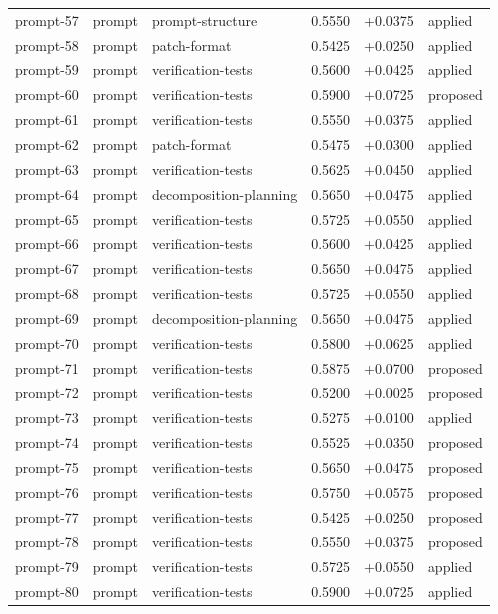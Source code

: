 \begin{center}
\begin{longtable}{llp{5.2cm}rrl}
prompt-57 & prompt & prompt-structure & 0.5550 & +0.0375 & applied \\
prompt-58 & prompt & patch-format & 0.5425 & +0.0250 & applied \\
prompt-59 & prompt & verification-tests & 0.5600 & +0.0425 & applied \\
prompt-60 & prompt & verification-tests & 0.5900 & +0.0725 & proposed \\
prompt-61 & prompt & verification-tests & 0.5550 & +0.0375 & applied \\
prompt-62 & prompt & patch-format & 0.5475 & +0.0300 & applied \\
prompt-63 & prompt & verification-tests & 0.5625 & +0.0450 & applied \\
prompt-64 & prompt & decomposition-planning & 0.5650 & +0.0475 & applied \\
prompt-65 & prompt & verification-tests & 0.5725 & +0.0550 & applied \\
prompt-66 & prompt & verification-tests & 0.5600 & +0.0425 & applied \\
prompt-67 & prompt & verification-tests & 0.5650 & +0.0475 & applied \\
prompt-68 & prompt & verification-tests & 0.5725 & +0.0550 & applied \\
prompt-69 & prompt & decomposition-planning & 0.5650 & +0.0475 & applied \\
prompt-70 & prompt & verification-tests & 0.5800 & +0.0625 & applied \\
prompt-71 & prompt & verification-tests & 0.5875 & +0.0700 & proposed \\
prompt-72 & prompt & verification-tests & 0.5200 & +0.0025 & proposed \\
prompt-73 & prompt & verification-tests & 0.5275 & +0.0100 & applied \\
prompt-74 & prompt & verification-tests & 0.5525 & +0.0350 & proposed \\
prompt-75 & prompt & verification-tests & 0.5650 & +0.0475 & proposed \\
prompt-76 & prompt & verification-tests & 0.5750 & +0.0575 & proposed \\
prompt-77 & prompt & verification-tests & 0.5425 & +0.0250 & proposed \\
prompt-78 & prompt & verification-tests & 0.5550 & +0.0375 & proposed \\
prompt-79 & prompt & verification-tests & 0.5725 & +0.0550 & applied \\
prompt-80 & prompt & verification-tests & 0.5900 & +0.0725 & applied \\

\end{longtable}
\end{center}
